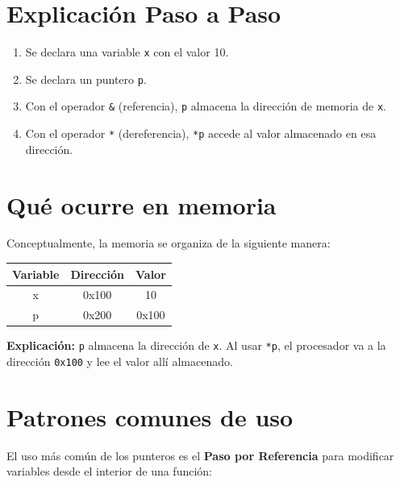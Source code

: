 \documentclass[12pt,a4paper]{article}
\begin{document}
\section{Explicación Paso a Paso}
\begin{enumerate}
    \item Se declara una variable \texttt{x} con el valor 10.
    \item Se declara un puntero \texttt{p}.
    \item Con el operador \texttt{\&} (referencia), \texttt{p} almacena la dirección de memoria de \texttt{x}.
    \item Con el operador \texttt{*} (dereferencia), \texttt{*p} accede al valor almacenado en esa dirección.
\end{enumerate}

\section{Qué ocurre en memoria}
Conceptualmente, la memoria se organiza de la siguiente manera:

\begin{center}
\begin{tabular}{|c|c|c|}
\hline
\textbf{Variable} & \textbf{Dirección} & \textbf{Valor} \\ \hline
x & 0x100 & 10 \\ \hline
p & 0x200 & 0x100 \\ \hline
\end{tabular}
\end{center}

\textbf{Explicación:} \texttt{p} almacena la dirección de \texttt{x}. Al usar \texttt{*p}, el procesador va a la dirección \texttt{0x100} y lee el valor allí almacenado.

\section{Patrones comunes de uso}
El uso más común de los punteros es el \textbf{Paso por Referencia} para modificar variables desde el interior de una función:

\begin{center}
\end{center}
\end{document}
